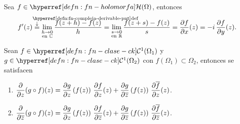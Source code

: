\begin{obs}\label{obs:derivada-holomorfa-wirtinger}
    Sea $f \in \exhyperref[defn:fn-holomorfa]{fn-holomorfa}{\mathcal{H}}(\Omega)$, entonces
    \[
    f'(z) \upexpl{=}{$\,$\exhyperref[defn:fn-compleja-derivable-pnt]{fn-compleja-derivable-pnt}{def}} \lim_{\substack{h \to 0 \\ \tex{en }\C}} \frac{f(z + h) - f(z)}{h} = \lim_{\substack{s \to 0 \\ \tex{en }\R}} \frac{f(z + s) - f(z)}{s} = \pdv{f}{x}(z) = -i \, \pdv{f}{y}(z).
    \]
\end{obs}

\begin{prop}\label{prop:regla-cadena-wirtinger}
    Sean $f \in \exhyperref[defn:fn-clase-ck]{fn-clase-ck}{\mathcal{C}^1}(\Omega_1)$ y $g \in \exhyperref[defn:fn-clase-ck]{fn-clase-ck}{\mathcal{C}^1}(\Omega_2)$ con $f(\Omega_1) \subset \Omega_2$, entonces se satisfacen
    \begin{enumerate}
        \item $\displaystyle \pdv{}{z} (g \circ f)(z) = \pdv{g}{z}\left(f(z)\right) \, \pdv{f}{z}(z) + \pdv{g}{\overline{z}}\left(f(z)\right) \, \pdv{\overline{f}}{z}(z)$.
        \item $\displaystyle \pdv{}{\overline{z}} (g \circ f)(z) = \pdv{g}{z}\left(f(z)\right) \,\pdv{f}{\overline{z}}(z) + \pdv{g}{\overline{z}}\left(f(z)\right) \, \pdv{\overline{f}}{\overline{z}}(z)$.
    \end{enumerate}
\end{prop}
